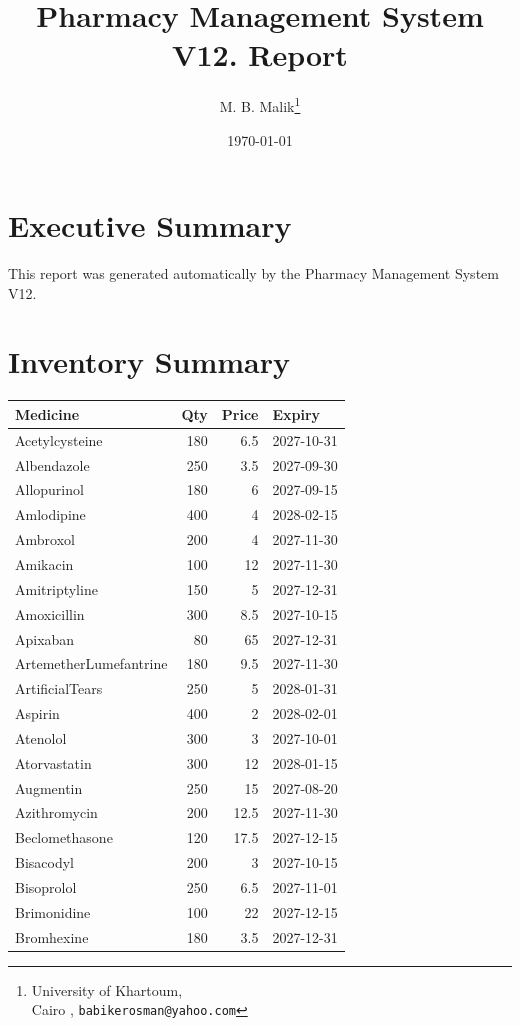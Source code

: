\documentclass[12pt]{article}
\title{\textcolor{titleColor}{\textbf{\Huge Pharmacy Management System V12. Report  }}}
\author{M. B. Malik\thanks{University of Khartoum,\\ Cairo , \texttt{babikerosman@yahoo.com}}}
\date{\today}
\begin{document}
\maketitle



\section*{Executive Summary}

This report was generated automatically by the Pharmacy Management System V12.


\section*{Inventory Summary}

\begin{longtable}{lrrl}
\toprule
Medicine & Qty & Price & Expiry \\
\midrule
Acetylcysteine & 180 & 6.5 & 2027-10-31 \\
Albendazole & 250 & 3.5 & 2027-09-30 \\
Allopurinol & 180 & 6 & 2027-09-15 \\
Amlodipine & 400 & 4 & 2028-02-15 \\
Ambroxol & 200 & 4 & 2027-11-30 \\
Amikacin & 100 & 12 & 2027-11-30 \\
Amitriptyline & 150 & 5 & 2027-12-31 \\
Amoxicillin & 300 & 8.5 & 2027-10-15 \\
Apixaban & 80 & 65 & 2027-12-31 \\
ArtemetherLumefantrine & 180 & 9.5 & 2027-11-30 \\
ArtificialTears & 250 & 5 & 2028-01-31 \\
Aspirin & 400 & 2 & 2028-02-01 \\
Atenolol & 300 & 3 & 2027-10-01 \\
Atorvastatin & 300 & 12 & 2028-01-15 \\
Augmentin & 250 & 15 & 2027-08-20 \\
Azithromycin & 200 & 12.5 & 2027-11-30 \\
Beclomethasone & 120 & 17.5 & 2027-12-15 \\
Bisacodyl & 200 & 3 & 2027-10-15 \\
Bisoprolol & 250 & 6.5 & 2027-11-01 \\
Brimonidine & 100 & 22 & 2027-12-15 \\
Bromhexine & 180 & 3.5 & 2027-12-31 \\

\end{longtable}
\end{document}
